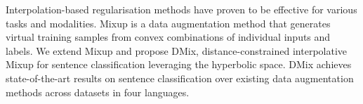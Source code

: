 Interpolation-based regularisation methods have proven to be effective for various tasks and modalities. Mixup is a data augmentation method that generates virtual training samples from convex combinations of individual inputs and labels. We extend Mixup and propose DMix, distance-constrained interpolative Mixup for sentence classification leveraging the hyperbolic space. DMix achieves state-of-the-art results on sentence classification over existing data augmentation methods across datasets in four languages.
